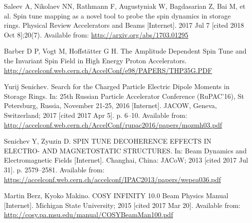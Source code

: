 \documentclass{article}
\begin{document}
\begin{thebibliography}{99}
  Saleev A, Nikolaev NN, Rathmann F, Augustyniak W, Bagdasarian Z, Bai M, et al. Spin tune mapping as a novel tool to probe the spin dynamics in storage rings. Physical Review Accelerators and Beams [Internet]. 2017 Jul 7 [cited 2018 Oct 8];20(7). Available from: \url{http://arxiv.org/abs/1703.01295}
  
  Barber D P, Vogt M, Hoffst\"atter G H. The Amplitude Dependent Spin Tune and the Invariant Spin Field in High Energy Proton Accelerators. \url{http://accelconf.web.cern.ch/AccelConf/e98/PAPERS/THP35G.PDF}

  Yurij Senichev. Search for the Charged Particle Electric Dipole Moments in Storage Rings. In: 25th Russian Particle Accelerator Conference (RuPAC’16), St Petersburg, Russia, November 21-25, 2016 [Internet]. JACOW, Geneva, Switzerland; 2017 [cited 2017 Apr 5]. p. 6–10. Available from: \url{http://accelconf.web.cern.ch/AccelConf/rupac2016/papers/mozmh03.pdf}

  Senichev Y, Zyuzin D. SPIN TUNE DECOHERENCE EFFECTS IN ELECTRO- AND  MAGNETOSTATIC STRUCTURES. In: Beam Dynamics and Electromagnetic Fields [Internet]. Changhai, China: JACoW; 2013 [cited 2017 Jul 31]. p. 2579--2581. Available from: \url{https://accelconf.web.cern.ch/accelconf/IPAC2013/papers/wepea036.pdf}

  Martin Berz, Kyoko Makino. COSY INFINITY 10.0 Beam Physics Manual [Internet]. Michigan State University; 2015 [cited 2017 Mar 20]. Available from: \url{http://cosy.pa.msu.edu/manual/COSYBeamMan100.pdf}

\end{thebibliography}
\end{document}
